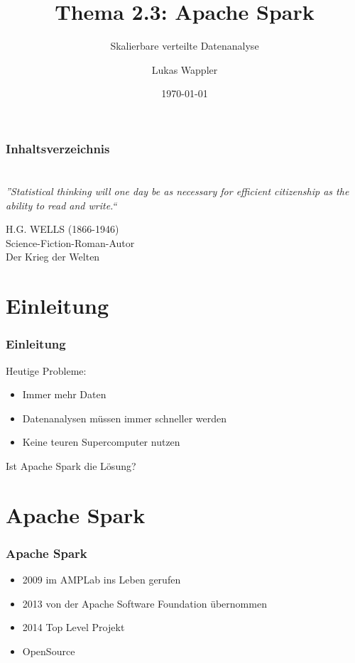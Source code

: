 \documentclass[hyperref={pdfpagelabels=false}]{beamer}
\title{Thema 2.3: Apache Spark}
\subtitle{Skalierbare verteilte Datenanalyse}
\author{Lukas Wappler}
\date{\today}
\begin{document}
\begin{frame}
\titlepage
\end{frame} 


\begin{frame}
\frametitle{Inhaltsverzeichnis}
\setcounter{tocdepth}{1}
\tableofcontents
\end{frame} 





\section{} 
\begin{frame}
\frametitle{} 
\begin{center}
\textit{\LARGE{”Statistical thinking will one day be as necessary for efficient citizenship
as the ability to read and write.“}}
\end{center}

\begin{flushright}
\footnotesize{H.G. WELLS (1866-1946)\\ Science-Fiction-Roman-Autor\\ Der Krieg der Welten}
\end{flushright}

\end{frame}


\section{Einleitung} 
\begin{frame}
\frametitle{Einleitung} 

Heutige Probleme:
\begin{itemize}
\item  Immer mehr Daten 
\item  Datenanalysen müssen immer schneller werden
\item  Keine teuren Supercomputer nutzen
\end{itemize}  

\huge{Ist Apache Spark die Lösung?}


\end{frame}

\section{Apache Spark} 
\begin{frame}
\frametitle{Apache Spark} 


\begin{itemize}
	\item 2009 im AMPLab ins Leben gerufen
	\item 2013 von der Apache Software Foundation übernommen
	\item 2014 Top Level Projekt	
	\item OpenSource	
\end{itemize}

\end{frame}
\end{document}

